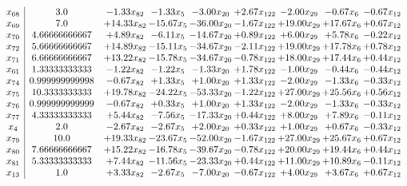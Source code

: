 \documentclass[8pt]{article}
\begin{document}
\[\begin{array}{c| c c@{\hskip 2pt} c@{\hskip 2pt} c@{\hskip 2pt} c@{\hskip 2pt} c@{\hskip 2pt} c@{\hskip 2pt} c@{\hskip 2pt} }
 x_{68}   &  3.0 & -1.33 x_{82} & -1.33 x_{5} & -3.00 x_{20} & +  2.67 x_{122} & -2.00 x_{29} & -0.67 x_{6} & -0.67 x_{12}\\
 x_{69}   &  7.0 & + 14.33 x_{82} & -15.67 x_{5} & -36.00 x_{20} & -1.67 x_{122} & + 19.00 x_{29} & + 17.67 x_{6} & +  0.67 x_{12}\\
 x_{70}   &  4.66666666667 & +  4.89 x_{82} & -6.11 x_{5} & -14.67 x_{20} & +  0.89 x_{122} & +  6.00 x_{29} & +  5.78 x_{6} & -0.22 x_{12}\\
 x_{72}   &  5.66666666667 & + 14.89 x_{82} & -15.11 x_{5} & -34.67 x_{20} & -2.11 x_{122} & + 19.00 x_{29} & + 17.78 x_{6} & +  0.78 x_{12}\\
 x_{71}   &  6.66666666667 & + 13.22 x_{82} & -15.78 x_{5} & -34.67 x_{20} & -0.78 x_{122} & + 18.00 x_{29} & + 17.44 x_{6} & +  0.44 x_{12}\\
 x_{61}   &  1.33333333333 & -1.22 x_{82} & -1.22 x_{5} & -1.33 x_{20} & +  1.78 x_{122} & -1.00 x_{29} & -0.44 x_{6} & -0.44 x_{12}\\
 x_{74}   &  0.999999999998 & -0.67 x_{82} & +  1.33 x_{5} & +  1.00 x_{20} & +  1.33 x_{122} & -2.00 x_{29} & -1.33 x_{6} & -0.33 x_{12}\\
 x_{75}   &  10.3333333333 & + 19.78 x_{82} & -24.22 x_{5} & -53.33 x_{20} & -1.22 x_{122} & + 27.00 x_{29} & + 25.56 x_{6} & +  0.56 x_{12}\\
 x_{76}   &  0.999999999999 & -0.67 x_{82} & +  0.33 x_{5} & +  1.00 x_{20} & +  1.33 x_{122} & -2.00 x_{29} & -1.33 x_{6} & -0.33 x_{12}\\
 x_{77}   &  4.33333333333 & +  5.44 x_{82} & -7.56 x_{5} & -17.33 x_{20} & +  0.44 x_{122} & +  8.00 x_{29} & +  7.89 x_{6} & -0.11 x_{12}\\
 x_{4}   &  2.0 & -2.67 x_{82} & -2.67 x_{5} & +  2.00 x_{20} & +  0.33 x_{122} & +  1.00 x_{29} & +  0.67 x_{6} & -0.33 x_{12}\\
 x_{79}   &  10.0 & + 19.33 x_{82} & -23.67 x_{5} & -52.00 x_{20} & -1.67 x_{122} & + 27.00 x_{29} & + 25.67 x_{6} & +  0.67 x_{12}\\
 x_{80}   &  7.66666666667 & + 15.22 x_{82} & -16.78 x_{5} & -39.67 x_{20} & -0.78 x_{122} & + 20.00 x_{29} & + 19.44 x_{6} & +  0.44 x_{12}\\
 x_{81}   &  5.33333333333 & +  7.44 x_{82} & -11.56 x_{5} & -23.33 x_{20} & +  0.44 x_{122} & + 11.00 x_{29} & + 10.89 x_{6} & -0.11 x_{12}\\
 x_{13}   &  1.0 & +  3.33 x_{82} & -2.67 x_{5} & -7.00 x_{20} & -0.67 x_{122} & +  4.00 x_{29} & +  3.67 x_{6} & +  0.67 x_{12}\\

\end{array}\]
\end{document}
